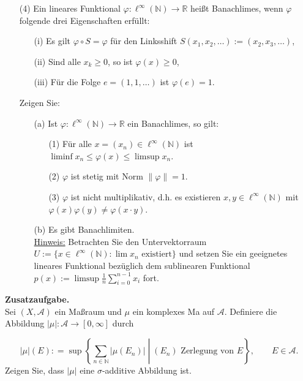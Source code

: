 \documentclass[12pt,a4paper]{article}
\newcommand{\IR}{{\mathbb{R}}}
\newcommand{\IN}{{\mathbb{N}}}
\begin{document}
\begin{itemize}
\item[(4)] Ein lineares Funktional $\varphi: \ell^\infty(\IN) \to \IR$ hei\ss t Banachlimes, wenn $\varphi$ folgende drei Eigenschaften erf\"ullt:
\begin{itemize}
\item[(i)] Es gilt $\varphi \circ S = \varphi$ f\"ur den Linksshift $S(x_1,x_2,\dots):= (x_2, x_3, \dots)$,
\item[(ii)] Sind alle $x_k \geq 0$, so ist $\varphi(x)\geq 0$,
\item[(iii)] F\"ur die Folge $e = (1,1,\dots)$ ist $\varphi(e)=1$.
\end{itemize}
Zeigen Sie:
\begin{itemize}
\item[(a)] Ist $\varphi : \ell^\infty(\IN) \to \IR$ ein Banachlimes, so gilt:
\begin{itemize}
\item[(1)]F\"ur alle $x=(x_n)\in \ell^\infty(\IN)$ ist $\liminf x_n \leq \varphi(x)\leq \limsup x_n$.
\item[(2)]$\varphi$ ist stetig mit Norm $\|\varphi\| =1$.
\item[(3)]$\varphi$ ist nicht multiplikativ, d.h. es existieren $x,y \in \ell^\infty(\IN)$ mit $\varphi(x)\varphi(y) \neq \varphi(x\cdot y)$.
\end{itemize}
\item[(b)]Es gibt Banachlimiten.\\
\underline{Hinweis:} Betrachten Sie den Untervektorraum $U:=\{x\in \ell^\infty(\IN):  \lim x_n \mbox{ existiert}\}$ und setzen Sie ein geeignetes lineares Funktional bez\"uglich dem sublinearen Funktional $p(x):= \limsup\frac{1}{n} \sum_{i=0}^{n-1} x_i$ fort.
\end{itemize}

\end{itemize}




\textbf{Zusatzaufgabe.}\\
Sei $(X,\mathcal{A})$ ein Ma\ss raum und $\mu$ ein komplexes Ma\3 auf $\mathcal{A}$. Definiere die Abbildung $|\mu|:\mathcal{A}\to [0,\infty]$ durch

$$|\mu| (E): = \sup \left\{ \left.\sum\limits_{n\in\mathbb{N}} |\mu (E_n)|\;\right|\; (E_n) \text{ Zerlegung von } E\right\},\qquad E\in\mathcal{A}.$$
Zeigen Sie, dass $|\mu|$ eine $\sigma$-additive Abbildung ist.
\end{document}
